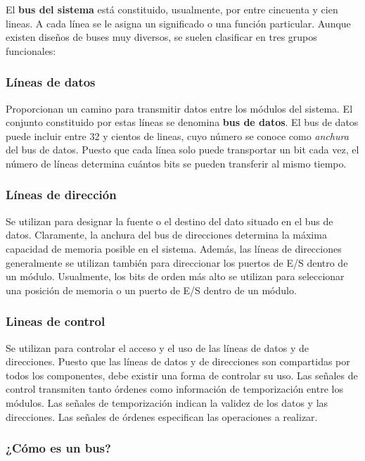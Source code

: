 El \textbf{bus del sistema} está constituido, usualmente, por entre cincuenta y cien lineas. A cada línea se le asigna un significado o una función particular. Aunque existen diseños de buses muy diversos, se suelen clasificar en tres grupos funcionales:

\subsubsection*{Líneas de datos} 

Proporcionan un camino para transmitir  datos entre los módulos del sistema. El conjunto constituido por estas líneas se denomina \textbf{bus de datos}. El bus de datos puede incluir entre 32 y cientos de lineas, cuyo número se conoce como \textit{anchura} del bus de datos. Puesto que cada línea solo puede transportar un bit cada vez, el número de líneas determina cuántos bits se pueden transferir al mismo tiempo.

\subsubsection*{Líneas de dirección}

Se utilizan para designar la fuente o el destino del dato situado en el bus de datos. Claramente, la anchura del bus de direcciones determina la máxima capacidad de memoria posible en el sistema. Además, las líneas de direcciones generalmente se utilizan también para direccionar los puertos de E/S dentro de un módulo. Usualmente, los bits de orden más alto se utilizan para seleccionar una posición de memoria o un puerto de E/S dentro de un módulo.

\subsubsection*{Lineas de control}

Se utilizan para controlar el acceso y el uso de las líneas de datos y de direcciones. Puesto que las líneas de datos y de direcciones son compartidas por todos los componentes, debe existir una forma de controlar su uso. Las señales de control transmiten tanto órdenes como información de temporización entre los módulos. Las señales de temporización indican la validez de los datos y las direcciones. Las señales de órdenes especifican las operaciones a realizar.

\subsubsection{¿Cómo es un bus?}

